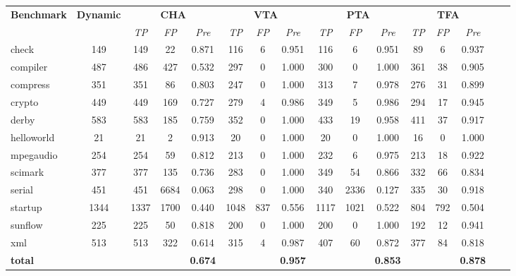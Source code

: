 \documentclass{fac}
\begin{document}
\begin{table} %
\centering
\begin{threeparttable}[b]
\begin{tabular*}{0.99\textwidth}{|l|c|c|c|c|c|c|c|c|c|c|c|c|c|c|c|}
	\hline
	\multirow{2}{*}{\textbf{Benchmark}} & \multirow{2}{*}{\hspace{-1pt}\textbf{Dynamic}\hspace{-1pt}} & \multicolumn{3}{c|}{\textbf{CHA}} & \multicolumn{3}{c|}{\textbf{VTA}} & \multicolumn{3}{c|}{\textbf{PTA}} & \multicolumn{3}{c|}{\textbf{TFA}}\\
\cline{3-14} &  & \textit{TP} & \textit{FP} & \textit{Pre} & \textit{TP} & \textit{FP} & \textit{Pre} & \textit{TP} & \textit{FP} & \textit{Pre} & \textit{TP} & \textit{FP} & \hspace{-1pt}\textit{Pre}\hspace{-1pt}\\
	\hline
	\hline
check & 149 & 149 & 22 & 0.871 & 116 & 6 & 0.951 & 116 & 6 & 0.951 & 89 & 6 & 0.937\\
compiler & 487 & 486 & 427 & 0.532 & 297 & 0 & 1.000 & 300 & 0 & 1.000 & 361 & 38 & 0.905\\
compress & 351 & 351 & 86 & 0.803 & 247 & 0 & 1.000 & 313 & 7 & 0.978 & 276 & 31 & 0.899\\
crypto & 449 & 449 & 169 & 0.727 & 279 & 4 & 0.986 & 349 & 5 & 0.986 & 294 & 17 & 0.945\\
derby & 583 & 583 & 185 & 0.759 & 352 & 0 & 1.000 & 433 & 19 & 0.958 & 411 & 37 & 0.917\\
helloworld & 21 & 21 & 2 & 0.913 & 20 & 0 & 1.000 & 20 & 0 & 1.000 & 16 & 0 & 1.000\\
mpegaudio & 254 & 254 & 59 & 0.812 & 213 & 0 & 1.000 & 232 & 6 & 0.975 & 213 & 18 & 0.922\\
scimark & 377 & 377 & 135 & 0.736 & 283 & 0 & 1.000 & 349 & 54 & 0.866 & 332 & 66 & 0.834\\
serial & 451 & 451 & 6684 & 0.063 & 298 & 0 & 1.000 & 340 & 2336 & 0.127 & 335 & 30 & 0.918\\
startup & 1344 & 1337 & 1700 & 0.440 & 1048 & 837 & 0.556 & 1117 & 1021 & 0.522 & 804 & 792 & 0.504\\
sunflow & 225 & 225 & 50 & 0.818 & 200 & 0 & 1.000 & 200 & 0 & 1.000 & 192 & 12 & 0.941\\
xml & 513 & 513 & 322 & 0.614 & 315 & 4 & 0.987 & 407 & 60 & 0.872 & 377 & 84 & 0.818\\
\hline
\textbf{total} & & & & \textbf{0.674} & & & \textbf{0.957} & & & \textbf{0.853} & & & \textbf{0.878} \\

\end{tabular*}
\end{threeparttable}
\end{table}
\end{document}
